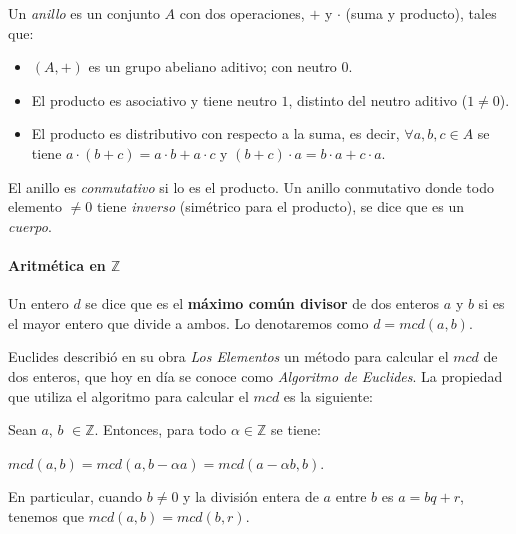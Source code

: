 \begin{definition}
	Un \textit{anillo} es un conjunto $A$ con dos operaciones, $+$ y $\cdot$ (suma y producto), tales que:
	\begin{itemize}
		\item $(A,+)$ es un grupo abeliano aditivo; con neutro $0$.
		\item El producto es asociativo y tiene neutro $1$, distinto del neutro aditivo ($1\neq 0$).
		\item El producto es distributivo con respecto a la suma, es decir, $\forall a,b,c \in A$ se tiene $a\cdot(b+c)=a\cdot b + a\cdot c$ y $(b+c)\cdot a = b\cdot a + c\cdot a$.
	\end{itemize}

	El anillo es \textit{conmutativo} si lo es el producto. Un anillo conmutativo donde todo elemento $\neq 0$ tiene \textit{inverso} (simétrico para el producto), se dice que es un \textit{cuerpo}.
	
\end{definition}




\hfil


\paragraph{Aritmética en $\mathbb{Z}$}

\begin{definition}
	Un entero $d$ se dice que es el \textbf{máximo común divisor} de dos enteros $a$ y $b$ si es el mayor entero que divide a ambos. Lo denotaremos como $d=mcd(a,b)$.
\end{definition}

\hfil

Euclides describió en su obra \textit{Los Elementos} un método para calcular el $mcd$ de dos enteros, que hoy en día se conoce como \textit{Algoritmo de Euclides}. La propiedad que utiliza el algoritmo para calcular el $mcd$ es la siguiente:



\begin{proposition}
	Sean $a$, $b$ $\in \mathbb{Z}$. Entonces, para todo $\alpha \in \mathbb{Z}$ se tiene:
	\begin{center}
		$mcd(a,b) = mcd(a, b-\alpha a) = mcd(a-\alpha b, b).$
	\end{center}
	En particular, cuando $b \neq 0$ y la división entera de $a$ entre $b$ es $a = bq + r$, tenemos que $mcd(a,b) = mcd(b, r)$.
\end{proposition}


